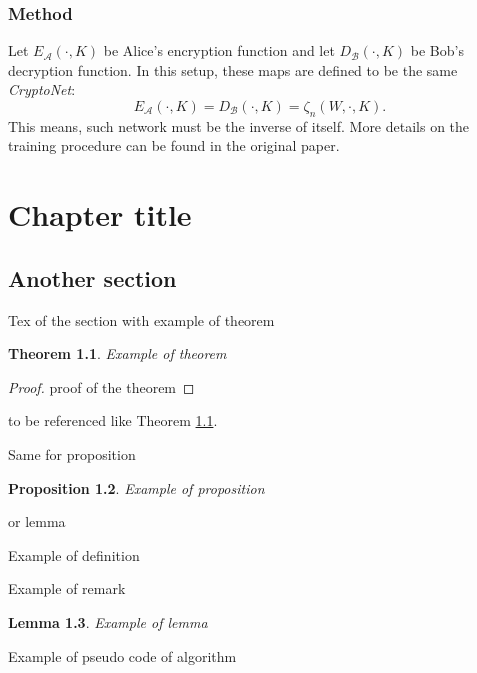 \documentclass[%
    corpo=11pt,
    twoside,
    stile=classica,
    oldstyle,
    autoretitolo,
    tipotesi=magistrale,
    greek,
    evenboxes,
    english
]{toptesi}
\newtheorem{theorem}{Theorem}[section]
\newtheorem{proposition}[theorem]{Proposition}
\newtheorem{lemma}[theorem]{Lemma}
\begin{document}
\subsection{Method}
Let $E_{\mathcal{A}}(\cdot, K)$ be Alice's encryption function and let $D_{\mathcal{B}}(\cdot, K)$ be Bob's decryption function. In this setup, these maps are defined to be the same \textit{CryptoNet}:
\begin{equation}
E_{\mathcal{A}}(\cdot, K) = D_{\mathcal{B}}(\cdot, K) = \zeta_n(W, \cdot, K).
\end{equation}
This means, such network must be the inverse of itself.
More details on the training procedure can be found in the original paper.
\chapter{Chapter title}

\section{Another section}

Tex of the section with example of theorem

\begin{theorem}\label{th1}
Example of theorem
\end{theorem}
\begin{proof}
proof of the theorem
\end{proof}

to be referenced like Theorem \ref{th1}. 

Same for proposition
\begin{proposition}
Example of proposition
\end{proposition}
 or lemma
\begin{definition}
Example of definition
\end{definition}

\begin{remark}
Example of remark
\end{remark}

\begin{lemma}
Example of lemma
\end{lemma}






\newpage
Example of pseudo code of algorithm
\end{document}
